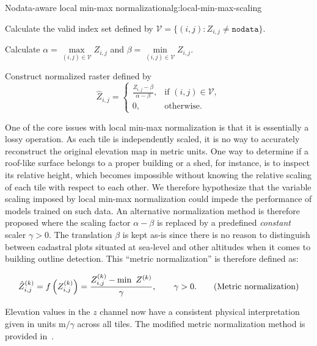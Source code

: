 \begin{algorithm}{Nodata-aware local min-max normalization}{alg:local-min-max-scaling}
  \item Calculate the valid index set defined by $\mathcal{V} = \{(i, j): Z_{i,j} \neq \texttt{nodata}\}$.
  \item Calculate $\alpha = \underset{(i,j) \in \mathcal{V}}{\max} Z_{i,j}$ and $\beta = \underset{(i,j) \in \mathcal{V}}{\min} Z_{i,j}$.
  \item Construct normalized raster defined by
    \begin{equation*}
        \hat{Z}_{i,j} = \begin{cases}
          \frac{Z_{i,j} - \beta}{\alpha - \beta}, & \text{if } (i,j) \in \mathcal{V}, \\
          0, & \text{otherwise.}
        \end{cases}
    \end{equation*}
\end{algorithm}

One of the core issues with local min-max normalization is that it is essentially a lossy operation.
As each tile is independently scaled, it is no way to accurately reconstruct the original elevation map in metric units.
One way to determine if a roof-like surface belongs to a proper building or a shed, for instance, is to inspect its relative height, which becomes impossible without knowing the relative scaling of each tile with respect to each other.
We therefore hypothesize that the variable scaling imposed by local min-max normalization could impede the performance of models trained on such data.
An alternative normalization method is therefore proposed where the scaling factor $\alpha - \beta$ is replaced by a predefined \textit{constant} scaler $\gamma > 0$.
The translation $\beta$ is kept as-is since there is no reason to distinguish between cadastral plots situated at sea-level and other altitudes when it comes to building outline detection.
This \enquote{metric normalization} is therefore defined as:

\begin{equation*}
  \hat{Z}_{i,j}^{(k)}
  =
  f\left(Z_{i,j}^{(k)}\right)
  =
  \frac{%
    Z_{i,j}^{(k)} - \min~Z^{(k)}
  }{%
    \gamma
  },%
  \hspace{2em} \gamma > 0.
  \tag{Metric normalization} %
  \label{test}
\end{equation*}

Elevation values in the $z$ channel now have a consistent physical interpretation given in units $\si{\meter} / \gamma$ across all tiles.
The modified metric normalization method is provided in~.

